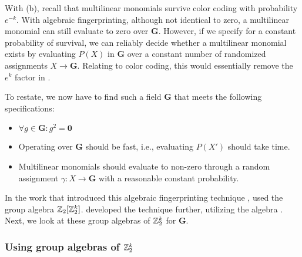 With (b), recall that multilinear monomials 
survive color coding with probability $e^{-k}$. 
With algebraic fingerprinting, although not identical to zero, a multilinear monomial 
can still evaluate to zero over $\mathbf{G}$. 
However, if we specify for a constant 
probability of survival, we can reliably decide whether a multilinear monomial exists 
by evaluating $P(X)$ in $\mathbf{G}$ over a constant number of 
randomized assignments $X \to \mathbf{G}$. Relating to color coding, 
this would essentially remove the 
$e^k$ factor in .

To restate, we now have to find such a field $\mathbf{G}$ that 
meets the following specifications: 
\begin{itemize}
  \item $\forall g \in \mathbf{G} \colon g^2 = \mathbf{0}$
  \item Operating over $\mathbf{G}$ should be fast, i.e., evaluating 
  $P(X')$ should take  time.
  \item Multilinear monomials should evaluate to non-zero
  through a random assignment 
  $\gamma \colon X \to \mathbf{G}$ with a reasonable constant probability.
\end{itemize}

In the work that introduced 
this algebraic fingerprinting technique \cite{Koutis08}, 
\citeauthor{Koutis08} used the group algebra $\mathbb Z_2[\mathbb Z_2^k]$. 
\citeauthor{Williams09} developed the technique further, 
utilizing the algebra
\cite{Williams09}. 
Next, we look at these 
group algebras of $\mathbb Z_2^k$ for $\mathbf{G}$. 

\subsubsection{Using group algebras of $\mathbb Z_2^k$}

